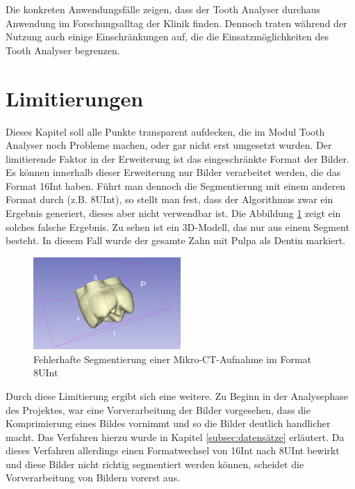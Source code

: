 Die konkreten Anwendungsfälle zeigen, dass der Tooth Analyser durchaus Anwendung
im Forschungsalltag der Klinik finden. Dennoch traten während der Nutzung auch einige
Einschränkungen auf, die die Einsatzmöglichkeiten des Tooth Analyser begrenzen.

\section{Limitierungen}
\label{sec:limitierungen} Dieses Kapitel soll alle Punkte transparent aufdecken,
die im Modul Tooth Analyser noch Probleme machen, oder gar nicht erst umgesetzt
wurden. Der limitierende Faktor in der Erweiterung ist das eingeschränkte Format
der Bilder. Es können innerhalb dieser Erweiterung nur Bilder verarbeitet werden,
die das Format \ac{16Int} haben. Führt man dennoch die Segmentierung mit einem anderen
Format durch (z.B. \ac{8UInt}), so stellt man fest, dass der Algorithmus zwar ein
Ergebnis generiert, dieses aber nicht verwendbar ist. Die Abbildung \ref{fig:3d_error}
zeigt ein solches falsche Ergebnis. Zu sehen ist ein \ac{3D}-Modell, das nur aus
einem Segment besteht. In diesem Fall wurde der gesamte Zahn mit Pulpa als Dentin
markiert.

\begin{figure}[h]
	\centering
	\includegraphics[width=0.5\textwidth]{img/3d_view_error.png}
	\caption{Fehlerhafte Segmentierung einer Mikro-CT-Aufnahme im Format 8UInt}
	\label{fig:3d_error}
\end{figure}

Durch diese Limitierung ergibt sich eine weitere. Zu Beginn in der Analysephase des
Projektes, war eine Vorverarbeitung der Bilder vorgesehen, dass die Komprimierung
eines Bildes vornimmt und so die Bilder deutlich handlicher macht. Das Verfahren
hierzu wurde in Kapitel \ref{subsec:datensätze} erläutert. Da dieses Verfahren allerdings
einen Formatwechsel von \ac{16Int} nach \ac{8UInt} bewirkt und diese Bilder nicht
richtig segmentiert werden können, scheidet die Vorverarbeitung von Bildern
vorerst aus.

